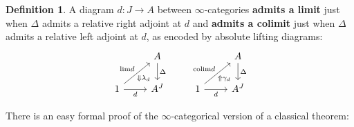 \documentclass[11pt]{ctexart}
\theoremstyle{definition}
\newtheorem{defn}[thm]{Definition}
\theoremstyle{remark}
\numberwithin{equation}{section}
\renewcommand{\lim}{\textup{lim}}
\newcommand{\colim}{\textup{colim}}
\newcommand{\1}{\mathbbe{1}}
\newcommand{\2}{\mathbbe{2}}
\newcommand{\3}{\mathbbe{3}}
\begin{document}
\begin{defn}\label{defn:elementwise-limit-colimit} A diagram $d \colon J \to A$ between $\infty$-categories \textbf{admits a limit} just when $\Delta$ admits a relative right adjoint at $d$ and \textbf{admits a colimit} just when $\Delta$ admits a relative left adjoint at $d$, as encoded by absolute lifting diagrams:
    \[
        \begin{tikzcd}
        \arrow[dr, phantom, "\scriptstyle\Downarrow\lambda_d" very near end] & A \arrow[d, "\Delta"]  & \arrow[dr, phantom, "\scriptstyle\Uparrow\gamma_d" very near end] & A \arrow[d, "\Delta"] \\ 1 \arrow[r, "d"']  \arrow[ur, "\lim d"] & A^J & 1 \arrow[r, "d"']  \arrow[ur, "\colim d"]  & A^J
        \end{tikzcd}
    \]
\end{defn}

There is an easy formal proof of the $\infty$-categorical version of a classical theorem:
\end{document}

